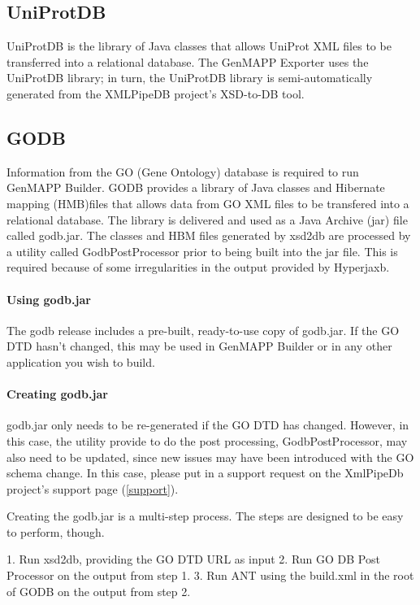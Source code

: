 \documentclass[11pt]{article}
\begin{document}
\subsection{UniProtDB}

UniProtDB is the library of Java classes that allows UniProt XML files to be transferred into a relational database.  The GenMAPP Exporter uses the UniProtDB library; in turn, the UniProtDB library is semi-automatically generated from the XMLPipeDB project's XSD-to-DB tool.

\subsection{GODB}
Information from the GO (Gene Ontology) database is required to run GenMAPP Builder. GODB provides a library of Java classes and Hibernate mapping (HMB)files that allows data from GO XML files to be transfered into a relational database. The library is delivered and used as a Java Archive (jar) file called godb.jar. The classes and HBM files generated by xsd2db are processed by a utility called GodbPostProcessor prior to being built into the jar file. This is required because of some irregularities in the output provided by Hyperjaxb.

\paragraph{Using godb.jar}
The godb release includes a pre-built, ready-to-use copy of godb.jar. If the GO DTD hasn't changed, this may be used in GenMAPP Builder or in any other application you wish to build.

\paragraph{Creating godb.jar} 
godb.jar only needs to be re-generated if the GO DTD has changed. However, in this case, the utility provide to do the post processing, GodbPostProcessor, may also need to be updated, since new issues may have been introduced with the GO schema change. In this case, please put in a support request on the XmlPipeDb project's support page (\ref{support}).

Creating the godb.jar is a multi-step process. The steps are designed to be easy to perform, though.

1. Run xsd2db, providing the GO DTD URL as input
2. Run GO DB Post Processor on the output from step 1.
3. Run ANT using the build.xml in the root of GODB on the output from step 2.
\end{document}
